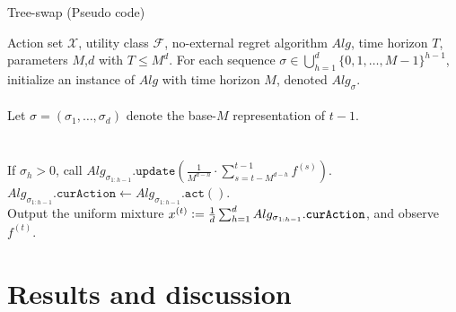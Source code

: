 \documentclass[aspectratio=169,xcolor=dvipsnames,t]{beamer}
\begin{document}
\begin{frame}[label=current]{Tree-swap (Pseudo code)}
    \begin{algorithm}[H]
    \begin{algorithmic}[1]
    \REQUIRE
        {Action set $\mathcal{X}$, utility class $\mathcal{F}$, no-external regret algorithm $Alg$, time horizon $T$, parameters $M$,$d$ with $T\leq M^d$.}
    \STATE For each sequence $\sigma \in \bigcup_{h=1}^d \{0, 1, \ldots, M-1\}^{h-1}$, initialize an instance of $Alg$ with time horizon $M$, denoted $Alg_\sigma$.\\
    \\
    \STATE Let $\sigma = (\sigma_1, \ldots, \sigma_d)$ denote the base-$M$ representation of $t-1$.\\
    \\
    \\
    \STATE If $\sigma_h > 0$, %
          call  $Alg_{\sigma_{1:h-1}}.\mathtt{update}\left(\frac{1}{M^{d-h}} \cdot \sum_{s=t-M^{d-h}}^{t-1} f^{(s)} \right)$.\\
    \STATE $Alg_{\sigma_{1:h-1}}.\mathtt{curAction} \gets Alg_{\sigma_{1:h-1}}.\mathtt{act()}$.\\
    \ENDIF
    \ENDFOR
    \STATE Output the uniform mixture $x^{(t)}\vcentcolon = 
          \frac{1}{d} \sum_{h=1}^d
           Alg_{\sigma_{1:h-1}}.\mathtt{curAction}$, and observe $f^{(t)}$.\\
    \ENDFOR
    \end{algorithmic}
    \label{alg:TreeSwapLAgorithm}
    \end{algorithm}
\end{frame}

\section{Results and discussion}
\end{document}
